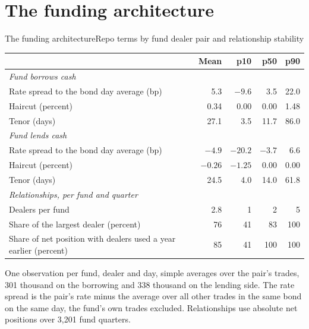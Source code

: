 \documentclass[aspectratio=169,11pt]{beamer}
\begin{document}
\section{The funding architecture}
\begin{frame}{The funding architecture}{Repo terms by fund dealer pair and relationship stability}
  \vspace{-0.6em}
  \begin{center}\scriptsize
  \begin{tabular}{lrrrr}
    \toprule
    & Mean & p10 & p50 & p90 \\
    \midrule
    \multicolumn{5}{l}{\textit{Fund borrows cash}} \\
    Rate spread to the bond day average (bp) & 5.3 & $-9.6$ & 3.5 & 22.0 \\
    Haircut (percent) & 0.34 & 0.00 & 0.00 & 1.48 \\
    Tenor (days) & 27.1 & 3.5 & 11.7 & 86.0 \\
    \midrule
    \multicolumn{5}{l}{\textit{Fund lends cash}} \\
    Rate spread to the bond day average (bp) & $-4.9$ & $-20.2$ & $-3.7$ & 6.6 \\
    Haircut (percent) & $-0.26$ & $-1.25$ & 0.00 & 0.00 \\
    Tenor (days) & 24.5 & 4.0 & 14.0 & 61.8 \\
    \midrule
    \multicolumn{5}{l}{\textit{Relationships, per fund and quarter}} \\
    Dealers per fund & 2.8 & 1 & 2 & 5 \\
    Share of the largest dealer (percent) & 76 & 41 & 83 & 100 \\
    Share of net position with dealers used a year earlier (percent) & 85 & 41 & 100 & 100 \\
    \bottomrule
  \end{tabular}
  \end{center}
  {\tiny\color{slate} One observation per fund, dealer and day, simple averages over the pair's trades, 301 thousand on the borrowing and 338 thousand on the lending side. The rate spread is the pair's rate minus the average over all other trades in the same bond on the same day, the fund's own trades excluded. Relationships use absolute net positions over 3,201 fund quarters.\par}
\end{frame}
\end{document}

